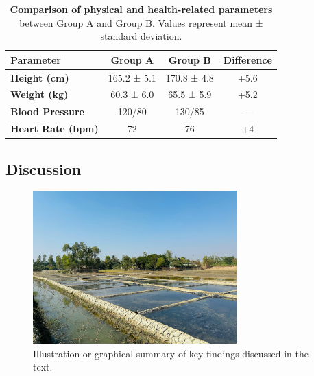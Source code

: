 \documentclass[11pt]{jabs}
\begin{document}
\vspace{1em}
\begin{table}[H]
\centering
\renewcommand{\arraystretch}{1.3}
\setlength{\tabcolsep}{12pt}

\begin{tabular}{>{\bfseries}l c c c}
\toprule
Parameter & Group A & Group B & Difference \\
\midrule
Height (cm)      & 165.2 ± 5.1  & 170.8 ± 4.8  & +5.6 \\
Weight (kg)      & 60.3 ± 6.0   & 65.5 ± 5.9   & +5.2 \\
Blood Pressure   & 120/80       & 130/85       & —    \\
Heart Rate (bpm) & 72           & 76           & +4   \\
\bottomrule
\end{tabular}
\caption{\textbf{Comparison of physical and health-related parameters} between Group A and Group B. Values represent mean ± standard deviation.}
\label{tab:styled-results}
\end{table}
\vspace{1em}

\begin{adjustwidth}{0.35\textwidth}{0pt}
\section*{Discussion}
\lipsum[7-8]

\end{adjustwidth}

\vspace{1em}
\begin{figure}[H]
  \centering
  \includegraphics[width=0.7\textwidth]{images/discussion-figure.png}
  \caption{Illustration or graphical summary of key findings discussed in the text.}
  \label{fig:discussion}
\end{figure}
\vspace{1em}
\end{document}
